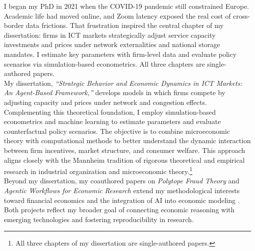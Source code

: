 \documentclass{nfr}
\begin{document}
I began my PhD in 2021 when the COVID-19 pandemic still constrained Europe. Academic life had moved online, and Zoom latency exposed the real cost of cross-border data frictions. That frustration inspired the central chapter of my dissertation: firms in ICT markets strategically adjust service capacity investments and prices under network externalities and national storage mandates. 
I estimate key parameters with firm-level data and evaluate policy scenarios via simulation-based econometrics. All three chapters are single-authored papers.\\

My dissertation, \textit{“Strategic Behavior and Economic Dynamics in ICT Markets: An Agent-Based Framework,”} develops models in which firms compete by adjusting capacity and prices under network and congestion effects. 
Complementing this theoretical foundation, I employ simulation-based econometrics and machine learning to estimate parameters and evaluate counterfactual policy scenarios. 
The objective is to combine microeconomic theory with computational methods to better understand the dynamic interaction between firm incentives, market structure, and consumer welfare. 
This approach aligns closely with the Mannheim tradition of rigorous theoretical and empirical research in industrial organization and microeconomic theory.\footnote{All three chapters of my dissertation are single-authored papers.}\\

Beyond my dissertation, my coauthored papers on \textit{Polytope Fraud Theory} and \textit{Agentic Workflows for Economic Research} extend my methodological interests toward financial economics and the integration of AI into economic modeling \citep{Zhao2025, Dawid2025}. 
Both projects reflect my broader goal of connecting economic reasoning with emerging technologies and fostering reproducibility in research.\\
\end{document}
